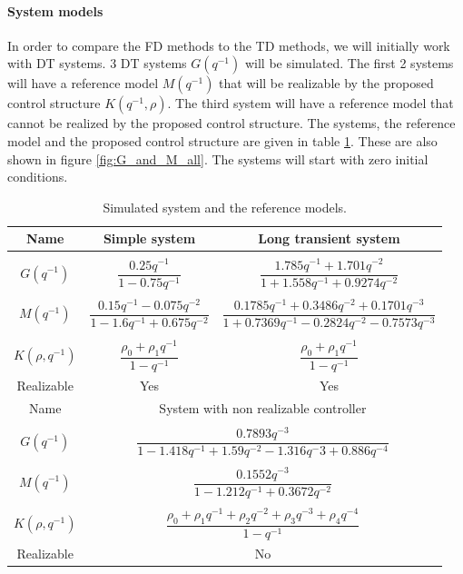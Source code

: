 \paragraph{System models}
In order to compare the FD methods to the TD methods, we will initially work with DT systems. 3 DT systems $G(q^{-1})$ will be simulated. The first 2 systems will have a reference model $M(q^{-1})$ that will be realizable by the proposed control structure $K(q^{-1},\rho)$. The third system will have a reference model that cannot be realized by the proposed control structure. The systems, the reference model and the proposed control structure are given in table \ref{tab:simulated_systems}. These are also shown in figure \ref{fig:G_and_M_all}. The systems will start with zero initial conditions.

\begin{table}[H]
\centering
\begin{tabular}{|ccc|}
\hline
Name & Simple system & Long transient system\\
\hline
&&\\[-2.5ex]
$G(q^{-1})$ & $\dfrac{0.25 q^{-1}}{1 - 0.75 q^{-1}}$ & $\dfrac{1.785 q^{-1} + 1.701 q^{-2}}{1 + 1.558 q^{-1} + 0.9274 q^{-2}}$ \\
\hline
&&\\[-2.5ex]
$M(q^{-1})$ & $\dfrac{0.15 q^{-1} - 0.075 q^{-2}}{1 - 1.6 q^{-1} + 0.675 q^{-2}}$ & $\dfrac{0.1785 q^{-1} + 0.3486 q^{-2} + 0.1701 q^{-3}}{1 + 0.7369 q^{-1} - 0.2824 q^{-2} - 0.7573 q^{-3}}$ \\
\hline
&&\\[-2.5ex]
$K(\rho,q^{-1})$ & $\dfrac{\rho_0 + \rho_1 q^{-1}}{1-q^{-1}}$ & $\dfrac{\rho_0 + \rho_1 q^{-1}}{1-q^{-1}}$ \\
\hline
Realizable & Yes & Yes \\
\hline
\hline
Name & \multicolumn{2}{c|}{System with non realizable controller} \\
\hline
&&\\[-2.5ex]
$G(q^{-1})$ & \multicolumn{2}{c|}{$\dfrac{0.7893 q^{-3}}{1 - 1.418 q^{-1} + 1.59 q^{-2} - 1.316 q{^-3} + 0.886 q^{-4}}$}\\
\hline
&&\\[-2.5ex]
$M(q^{-1})$ & \multicolumn{2}{c|}{$\dfrac{0.1552 q^{-3}}{1 - 1.212 q^{-1} + 0.3672 q^{-2}}$} \\
\hline
&&\\[-2.5ex]
$K(\rho,q^{-1})$ & \multicolumn{2}{c|}{$\dfrac{\rho_0 + \rho_1 q^{-1} + \rho_2 q^{-2} + \rho_3 q^{-3} + \rho_4 q^{-4}}{1-q^{-1}}$} \\
\hline
Realizable & \multicolumn{2}{c|}{No} \\
\hline
\end{tabular}
\caption{Simulated system and the reference models.}
\label{tab:simulated_systems}
\end{table}


